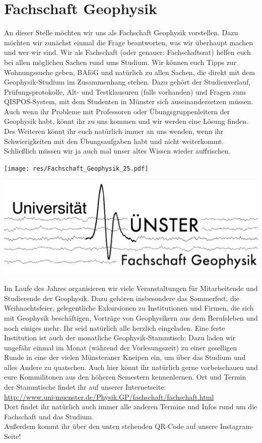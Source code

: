 \section{Fachschaft Geophysik}
\begin{multicols*}{2}
An dieser Stelle möchten wir uns als Fachschaft Geophysik vorstellen.
Dazu möchten wir zunächst einmal die Frage beantworten, was wir überhaupt machen und wer wir sind.
Wir als Fachschaft (oder genauer: Fachschaftsrat) helfen euch bei allen möglichen Sachen rund ums Studium.
Wir können euch Tipps zur Wohnungssuche geben, BAföG und natürlich zu allen Sachen, die direkt mit dem Geophysik-Studium im Zusammenhang stehen.
Dazu gehört der Studienverlauf, Prüfungsprotokolle, Alt- und Testklausuren (falls vorhanden) und Fragen zum QISPOS-System, mit dem Studenten in Münster sich auseinandersetzen müssen.
Auch wenn ihr Probleme mit Professoren oder Übungsgruppenleitern der Geophysik habt, könnt ihr zu uns kommen und wir werden eine Lösung finden.
Des Weiteren könnt ihr euch natürlich immer an uns wenden, wenn ihr Schwierigkeiten mit den Übungsaufgaben habt und nicht weiterkommt.
Schließlich müssen wir ja auch mal unser altes Wissen wieder auffrischen.

\begin{center}
	\texttt{[image: res/Fachschaft\_Geophysik\_25.pdf]}
	
	\includegraphics[width=0.8\columnwidth]{res/fs_geophysik_logo_neu.jpg}
\end{center}

Im Laufe des Jahres organisieren wir viele Veranstaltungen für Mitarbeitende und Studierende der Geophysik.
Dazu gehören insbesondere das Sommerfest, die Weihnachtsfeier, gelegentliche Exkursionen zu Institutionen und Firmen, die sich mit Geophysik beschäftigen, Vorträge von Geophysikern aus dem Berufsleben und noch einiges mehr.
Ihr seid natürlich alle herzlich eingeladen.
Eine feste Institution ist auch der monatliche Geophysik-Stammtisch:
Dazu laden wir ungefähr einmal im Monat (während der Vorlesungszeit) zu einer geselligen Runde in eine der vielen Münsteraner Kneipen ein, um über das Studium und alles Andere zu quatschen.
Auch hier könnt ihr natürlich gerne vorbeischauen und eure Kommilitonen aus den höheren Semestern kennenlernen.
Ort und Termin der Stammtische findet ihr auf unserer Internetseite:\\
\url{http://www.uni-muenster.de/Physik.GP/fachschaft/fachschaft.html}\\
Dort findet ihr natürlich auch immer alle anderen Termine und Infos rund um die Fachschaft und das Studium.\\
Außerdem kommt ihr über den unten stehenden QR-Code auf unsere Instagram-Seite!


\end{multicols*}
